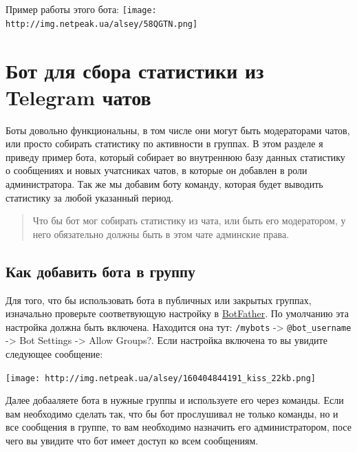 \documentclass[
]{book}
\newenvironment{Shaded}{\begin{snugshade}}{\end{snugshade}}
\newcommand{\CommentTok}[1]{\textcolor[rgb]{0.56,0.35,0.01}{\textit{#1}}}
\newcommand{\FunctionTok}[1]{\textcolor[rgb]{0.13,0.29,0.53}{\textbf{#1}}}
\newcommand{\NormalTok}[1]{#1}
\newcommand{\SpecialCharTok}[1]{\textcolor[rgb]{0.81,0.36,0.00}{\textbf{#1}}}
\begin{document}
\begin{Shaded}
\end{Shaded}

Пример работы этого бота:
\texttt{[image: http://img.netpeak.ua/alsey/58QGTN.png]}

\section{Бот для сбора статистики из Telegram чатов}\label{ux431ux43eux442-ux434ux43bux44f-ux441ux431ux43eux440ux430-ux441ux442ux430ux442ux438ux441ux442ux438ux43aux438-ux438ux437-telegram-ux447ux430ux442ux43eux432}

Боты довольно функциональны, в том числе они могут быть модераторами чатов, или просто собирать статистику по активности в группах. В этом разделе я приведу пример бота, который собирает во внутреннюю базу данных статистику о сообщениях и новых учатсниках чатов, в которые он добавлен в роли администратора. Так же мы добавим боту команду, которая будет выводить статистику за любой указанный период.

\begin{quote}
Что бы бот мог собирать статистику из чата, или быть его модератором, у него обязательно должны быть в этом чате админские права.
\end{quote}

\subsection{Как добавить бота в группу}\label{ux43aux430ux43a-ux434ux43eux431ux430ux432ux438ux442ux44c-ux431ux43eux442ux430-ux432-ux433ux440ux443ux43fux43fux443}

Для того, что бы использовать бота в публичных или закрытых группах, изначально проверьте соответвующую настройку в \href{http://t.me/BotFather}{BotFather}. По умолчанию эта настройка должна быть включена. Находится она тут: \texttt{/mybots} -\textgreater{} \texttt{@bot\_username} -\textgreater{} Bot Settings -\textgreater{} Allow Groups?. Если настройка включена то вы увидите следующее сообщение:

\texttt{[image: http://img.netpeak.ua/alsey/160404844191\_kiss\_22kb.png]}

Далее добааляете бота в нужные группы и используете его через команды. Если вам необходимо сделать так, что бы бот прослушивал не только команды, но и все сообщения в группе, то вам необходимо назначить его администратором, посе чего вы увидите что бот имеет доступ ко всем сообщениям.
\end{document}
